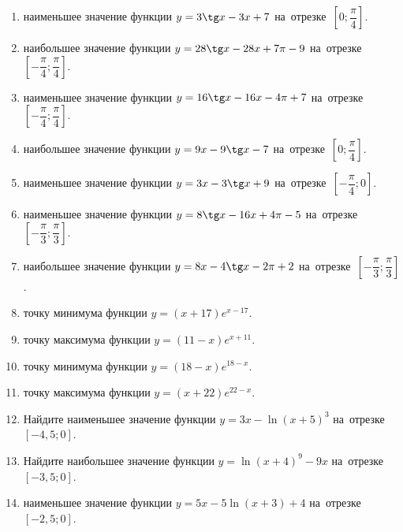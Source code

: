 \documentclass[a4paper,10pt]{article}
\begin{document}
\begin{enumerate}
\item {} наименьшее значение функции $y=3\tg x-3x+7$ на~отрезке~$\left[0;\dfrac{\pi }{4}\right]$.

\item {} наибольшее значение функции $y=28\tg x-28x+7\pi -9$ на~отрезке~$\left[-\dfrac{\pi }{4};\dfrac{\pi }{4}\right]$.

\item {} наименьшее значение функции $y=16\tg x-16x-4\pi +7$ на~отрезке~$\left[-\dfrac{\pi }{4};\dfrac{\pi }{4}\right]$.

\item {} наибольшее значение функции $y=9x-9\tg x-7$ на~отрезке~$\left[0;\dfrac{\pi }{4}\right]$.

\item {} наименьшее значение функции $y=3x-3\tg x+9$ на~отрезке~$\left[-\dfrac{\pi }{4};0\right]$.

\item {} наименьшее значение функции $y=8\tg x-16x+4\pi -5$ на~отрезке~$\left[-\dfrac{\pi }{3};\dfrac{\pi }{3}\right]$.

\item {} наибольшее значение функции $y=8x-4\tg x-2\pi +2$ на~отрезке~$\left[-\dfrac{\pi }{3};\dfrac{\pi }{3}\right]$.

\item {} точку минимума функции $y=\left(x+17\right)e^{x-17}$.

\item {} точку максимума функции $y=\left(11-x\right)e^{x+11}$.

\item {} точку минимума функции $y=\left(18-x\right)e^{18-x}$.

\item {} точку максимума функции $y=\left(x+22\right)e^{22-x}$.

\item Найдите наименьшее значение функции $y=3x-\ln \left(x+5\right)^3$ на~отрезке~$\left[-4,5;0\right]$.

\item Найдите наибольшее значение функции $y=\ln \left(x+4\right)^9-9x$ на~отрезке~$\left[-3,5;0\right]$.

\item {} наименьшее значение функции $y=5x-5\ln \left(x+3\right)+4$ на~отрезке~$\left[-2,5;0\right]$.


\end{enumerate}
\end{document}
